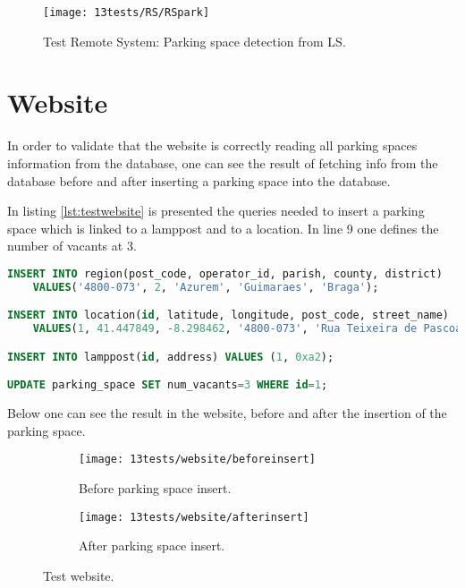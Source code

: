 \begin{figure}[H]
	\centering	
	\texttt{[image: 13tests/RS/RSpark]}
	\caption{Test Remote System: Parking space detection from LS.}
	\label{fig:RSpark}
\end{figure}

\clearpage
\section{Website}
In order to validate that the website is correctly reading all parking spaces information from the database, one can see the result of fetching info from the database before and after inserting a parking space into the database.

In listing \ref{lst:testwebsite} is presented the queries needed to insert a parking space which is linked to a lamppost and to a location. In line 9 one defines the number of vacants at 3.

\begin{lstlisting}[language=SQL, caption={Test Website: add parking space to the database.}, label={lst:testwebsite}]
INSERT INTO region(post_code, operator_id, parish, county, district) 
	VALUES('4800-073', 2, 'Azurem', 'Guimaraes', 'Braga');

INSERT INTO location(id, latitude, longitude, post_code, street_name) 
	VALUES(1, 41.447849, -8.298462, '4800-073', 'Rua Teixeira de Pascoais');

INSERT INTO lamppost(id, address) VALUES (1, 0xa2);

UPDATE parking_space SET num_vacants=3 WHERE id=1;
\end{lstlisting}

Below one can see the result in the website, before and after the insertion of the parking space.

\begin{figure}[H]
	\centering
	\begin{subfigure}{.4\textwidth}
		\centering
		\texttt{[image: 13tests/website/beforeinsert]}
		\caption{Before parking space insert.}
		\label{fig:login}
	\end{subfigure}%
	\begin{subfigure}{.4\textwidth}
		\centering
		\texttt{[image: 13tests/website/afterinsert]}
		\caption{After parking space insert.}
		\label{fig:menu}
	\end{subfigure}
	\caption{Test website.}
	\label{fig:applogin}
\end{figure}

